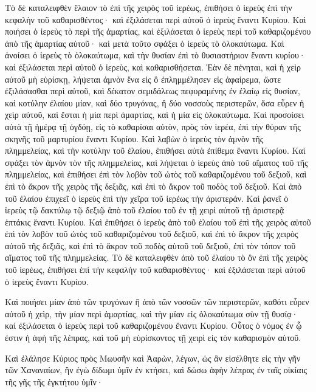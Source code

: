 {Τὸ δὲ καταλειφθὲν ἔλαιον τὸ ἐπὶ τῆς χειρὸς τοῦ ἱερέως, ἐπιθήσει ὁ ἱερεὺς ἐπὶ τὴν κεφαλὴν τοῦ καθαρισθέντος· καὶ ἐξιλάσεται περὶ αὐτοῦ ὁ ἱερεὺς ἔναντι Κυρίου.
Καὶ ποιήσει ὁ ἱερεὺς τὸ περὶ τῆς ἁμαρτίας, καὶ ἐξιλάσεται ὁ ἱερεὺς περὶ τοῦ καθαριζομένου ἀπὸ τῆς ἁμαρτίας αὐτοῦ· καὶ μετὰ τοῦτο σφάξει ὁ ἱερεὺς τὸ ὁλοκαύτωμα.
Καὶ ἀνοίσει ὁ ἱερεὺς τὸ ὁλοκαύτωμα, καὶ τὴν θυσίαν ἐπὶ τὸ θυσιαστήριον ἔναντι κυρίου· καὶ ἐξιλάσεται περὶ αὐτοῦ ὁ ἱερεὺς, καὶ καθαρισθήσεται.
Ἐὰν δὲ πένηται, καὶ ἡ χεὶρ αὐτοῦ μὴ εὑρίσκῃ, λήψεται ἀμνὸν ἕνα εἰς ὃ ἐπλημμέλησεν εἰς ἀφαίρεμα, ὥστε ἐξιλάσασθαι περὶ αὐτοῦ, καὶ δέκατον σεμιδάλεως πεφυραμένης ἐν ἐλαίῳ εἰς θυσίαν, καὶ κοτύλην ἐλαίου μίαν,
καὶ δύο τρυγόνας, ἢ δύο νοσσοὺς περιστερῶν, ὅσα εὗρεν ἡ χεὶρ αὐτοῦ, καὶ ἔσται ἡ μία περὶ ἁμαρτίας, καὶ ἡ μία εἰς ὁλοκαύτωμα.
Καὶ προσοίσει αὐτὰ τῇ ἡμέρᾳ τῇ ὀγδόῃ, εἰς τὸ καθαρίσαι αὐτὸν, πρὸς τὸν ἱερέα, ἐπὶ τὴν θύραν τῆς σκηνῆς τοῦ μαρτυρίου ἔναντι Κυρίου.
Καὶ λαβὼν ὁ ἱερεὺς τὸν ἀμνὸν τῆς πλημμελείας, καὶ τὴν κοτύλην τοῦ ἐλαίου, ἐπιθήσει αὐτὰ ἐπίθεμα ἔναντι Κυρίου.
Καὶ σφάξει τὸν ἀμνὸν τὸν τῆς πλημμελείας, καὶ λήψεται ὁ ἱερεὺς ἀπὸ τοῦ αἵματος τοῦ τῆς πλημμελείας, καὶ ἐπιθήσει ἐπὶ τὸν λοβὸν τοῦ ὠτὸς τοῦ καθαριζομένου τοῦ δεξιοῦ, καὶ ἐπὶ τὸ ἄκρον τῆς χειρὸς τῆς δεξιᾶς, καὶ ἐπὶ τὸ ἄκρον τοῦ ποδὸς τοῦ δεξιοῦ.
Καὶ ἀπὸ τοῦ ἐλαίου ἐπιχεεῖ ὁ ἱερεὺς ἐπὶ τὴν χεῖρα τοῦ ἱερέως τὴν ἀριστεράν.
Καὶ ῥανεῖ ὁ ἱερεὺς τῷ δακτύλῳ τῷ δεξιῷ ἀπὸ τοῦ ἐλαίου τοῦ ἐν τῇ χειρὶ αὐτοῦ τῇ ἀριστερᾷ ἑπτάκις ἔναντι Κυρίου.
Καὶ ἐπιθήσει ὁ ἱερεὺς ἀπὸ τοῦ ἐλαίου τοῦ ἐπὶ τῆς χειρὸς αὐτοῦ ἐπὶ τὸν λοβὸν τοῦ ὠτὸς τοῦ καθαριζομένου τοῦ δεξιοῦ, καὶ ἐπὶ τὸ ἄκρον τῆς χειρὸς αὐτοῦ τῆς δεξιᾶς, καὶ ἐπὶ τὸ ἄκρον τοῦ ποδὸς αὐτοῦ τοῦ δεξιοῦ, ἐπὶ τὸν τόπον τοῦ αἵματος τοῦ τῆς πλημμελείας.
Τὸ δὲ καταλειφθὲν ἀπὸ τοῦ ἐλαίου τὸ ὂν ἐπὶ τῆς χειρὸς τοῦ ἱερέως, ἐπιθήσει ἐπὶ τὴν κεφαλὴν τοῦ καθαρισθέντος· καὶ ἐξιλάσεται περὶ αὐτοῦ ὁ ἱερεὺς ἔναντι Κυρίου.
\par }{\PP {}Καὶ ποιήσει μίαν ἀπὸ τῶν τρυγόνων ἢ ἀπὸ τῶν νοσσῶν τῶν περιστερῶν, καθότι εὗρεν αὐτοῦ ἡ χεὶρ,
τὴν μίαν περὶ ἁμαρτίας, καὶ τὴν μίαν εἰς ὁλοκαύτωμα σὺν τῇ θυσίᾳ· καὶ ἐξιλάσεται ὁ ἱερεὺς περὶ τοῦ καθαριζομένου ἔναντι Κυρίου.
Οὗτος ὁ νόμος ἐν ᾧ ἐστιν ἡ ἁφὴ τῆς λέπρας, καὶ τοῦ μὴ εὑρίσκοντος τῇ χειρὶ εἰς τὸν καθαρισμὸν αὐτοῦ.
\par }{\PP {}Καὶ ἐλάλησε Κύριος πρὸς Μωυσῆν καὶ Ἀαρὼν, λέγων,
ὡς ἂν εἰσέλθητε εἰς τὴν γῆν τῶν Χαναναίων, ἣν ἐγὼ δίδωμι ὑμῖν ἐν κτήσει, καὶ δώσω ἁφὴν λέπρας ἐν ταῖς οἰκίαις τῆς γῆς τῆς ἐγκτήτου ὑμῖν·
}
